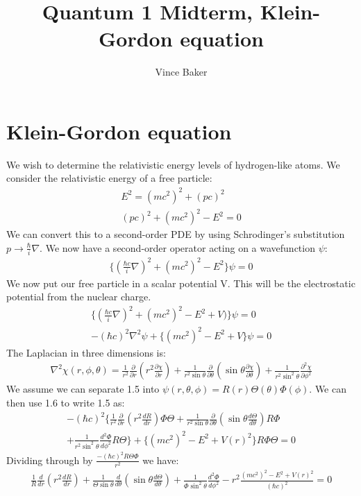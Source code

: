 \documentclass[a4paper,10pt]{article}
\title{Quantum 1 Midterm, Klein-Gordon equation}
\author{Vince Baker}
\numberwithin{equation}{section}
\begin{document}
\maketitle

\section{Klein-Gordon equation}
We wish to determine the relativistic energy levels of hydrogen-like atoms.
We consider the relativistic energy of a free particle:
\begin{gather}
 E^2=(mc^2)^2+(pc)^2\\
 (pc)^2+(mc^2)^2-E^2=0
\end{gather}
We can convert this to a second-order PDE by using Schrodinger's substitution $p\rightarrow\frac{\hbar}{i}\nabla$.
We now have a second-order operator acting on a wavefunction $\psi$:
\begin{gather}
\{(\frac{\hbar c}{i}\nabla)^2+(mc^2)^2-E^2\}\psi = 0
\end{gather}
We now put our free particle in a scalar potential V. 
This will be the electrostatic potential from the nuclear charge.
\begin{gather}
 \{(\frac{\hbar c}{i}\nabla)^2+(mc^2)^2-E^2+V)\}\psi = 0\\
 -(\hbar c)^2\nabla ^2\psi+\{(mc^2)^2-E^2+V\}\psi=0
\end{gather}
The Laplacian in three dimensions is:
\begin{gather}
 \nabla^2\chi(r,\phi,\theta)=\frac{1}{r^2}\frac{\partial}{\partial r}(r^2\frac{\partial \chi}{\partial r})+\frac{1}{r^2\sin \theta}\frac{\partial}{\partial \theta}(\sin \theta \frac{\partial \chi}{\partial \theta} )
 +\frac{1}{r^2 \sin ^2 \theta}\frac{\partial ^2 \chi}{\partial \phi^2}
\end{gather}
We assume we can separate 1.5 into $\psi(r,\theta, \phi)=R(r)\Theta(\theta)\Phi(\phi)$. We can then use 1.6 to write 1.5 as:
\begin{multline}
  -(\hbar c)^2\{\frac{1}{r^2}\frac{\partial}{\partial r}(r^2\frac{dR}{dr})\Phi\Theta+\frac{1}{r^2\sin \theta}\frac{\partial}{\partial \theta}(\sin \theta \frac{d\Theta}{d \theta})R\Phi\\
 +\frac{1}{r^2 \sin ^2 \theta}\frac{d^2\Phi}{d \phi^2}R\Theta\}
 +\{(mc^2)^2-E^2+V(r)^2\}R\Phi\Theta=0
\end{multline}
Dividing through by $\frac{-(\hbar c)^2R\Theta\Phi}{r^2}$ we have:
\begin{gather}
 \frac{1}{R}\frac{d}{dr}(r^2\frac{dR}{dr})+\frac{1}{\Theta\sin \theta}\frac{d}{d \theta}(\sin \theta \frac{d\Theta}{d \theta})
 +\frac{1}{\Phi \sin ^2 \theta}\frac{d^2\Phi}{d \phi^2}
 -r^2\frac{(mc^2)^2-E^2+V(r)^2}{(\hbar c)^2}=0
\end{gather}
\end{document}
